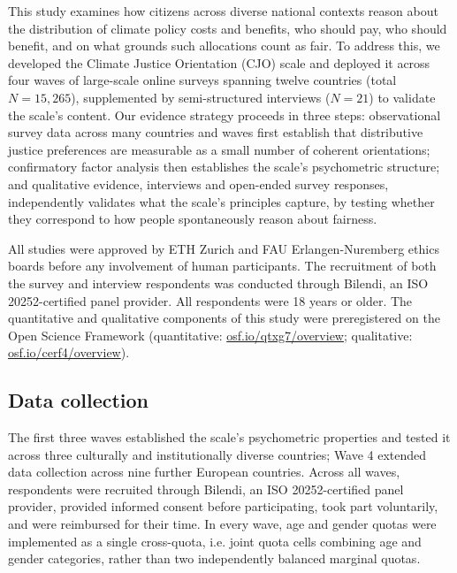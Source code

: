 \documentclass[10pt,letterpaper]{article}
\begin{document}
This study examines how citizens across diverse national contexts reason about the distribution of climate policy costs and benefits, who should pay, who should benefit, and on what grounds such allocations count as fair.
To address this, we developed the Climate Justice Orientation (CJO) scale and deployed it across four waves of large-scale online surveys spanning twelve countries (total $N = 15,265$), supplemented by semi-structured interviews ($N = 21$) to validate the scale's content.
Our evidence strategy proceeds in three steps: observational survey data across many countries and waves first establish that distributive justice preferences are measurable as a small number of coherent orientations; confirmatory factor analysis then establishes the scale's psychometric structure; and qualitative evidence, interviews and open-ended survey responses, independently validates what the scale's principles capture, by testing whether they correspond to how people spontaneously reason about fairness.

All studies were approved by ETH Zurich and FAU Erlangen-Nuremberg ethics boards before any involvement of human participants.
The recruitment of both the survey and interview respondents was conducted through Bilendi, an ISO 20252-certified panel provider.
All respondents were 18 years or older.
The quantitative and qualitative components of this study were preregistered on the Open Science Framework (quantitative: \href{https://osf.io/qtxg7/overview}{osf.io/qtxg7/overview}; qualitative: \href{https://osf.io/cerf4/overview}{osf.io/cerf4/overview}).

\subsection*{Data collection}
The first three waves established the scale's psychometric properties and tested it across three culturally and institutionally diverse countries; Wave 4 extended data collection across nine further European countries. Across all waves, respondents were recruited through Bilendi, an ISO 20252-certified panel provider, provided informed consent before participating, took part voluntarily, and were reimbursed for their time. In every wave, age and gender quotas were implemented as a single cross-quota, i.e. joint quota cells combining age and gender categories, rather than two independently balanced marginal quotas.
\end{document}
